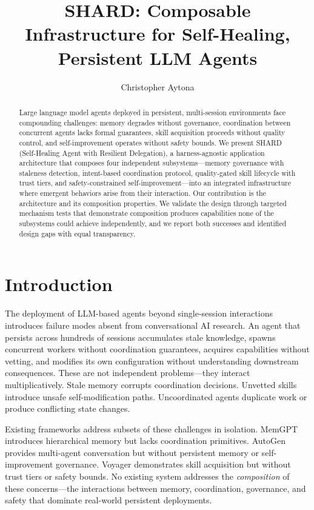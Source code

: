 \documentclass[11pt]{article}
\title{SHARD: Composable Infrastructure for Self-Healing, Persistent LLM Agents}
\author{Christopher Aytona}
\date{}
\begin{document}
\maketitle

\begin{abstract}
Large language model agents deployed in persistent, multi-session environments face compounding challenges: memory degrades without governance, coordination between concurrent agents lacks formal guarantees, skill acquisition proceeds without quality control, and self-improvement operates without safety bounds. We present SHARD (Self-Healing Agent with Resilient Delegation), a harness-agnostic application architecture that composes four independent subsystems---memory governance with staleness detection, intent-based coordination protocol, quality-gated skill lifecycle with trust tiers, and safety-constrained self-improvement---into an integrated infrastructure where emergent behaviors arise from their interaction. Our contribution is the architecture and its composition properties. We validate the design through targeted mechanism tests that demonstrate composition produces capabilities none of the subsystems could achieve independently, and we report both successes and identified design gaps with equal transparency.
\end{abstract}

\section{Introduction}

The deployment of LLM-based agents beyond single-session interactions introduces failure modes absent from conversational AI research. An agent that persists across hundreds of sessions accumulates stale knowledge, spawns concurrent workers without coordination guarantees, acquires capabilities without vetting, and modifies its own configuration without understanding downstream consequences. These are not independent problems---they interact multiplicatively. Stale memory corrupts coordination decisions. Unvetted skills introduce unsafe self-modification paths. Uncoordinated agents duplicate work or produce conflicting state changes.

Existing frameworks address subsets of these challenges in isolation. MemGPT \citep{packer2023memgpt} introduces hierarchical memory but lacks coordination primitives. AutoGen \citep{wu2023autogen} provides multi-agent conversation but without persistent memory or self-improvement governance. Voyager \citep{wang2023voyager} demonstrates skill acquisition but without trust tiers or safety bounds. No existing system addresses the \emph{composition} of these concerns---the interactions between memory, coordination, governance, and safety that dominate real-world persistent deployments.
\end{document}
